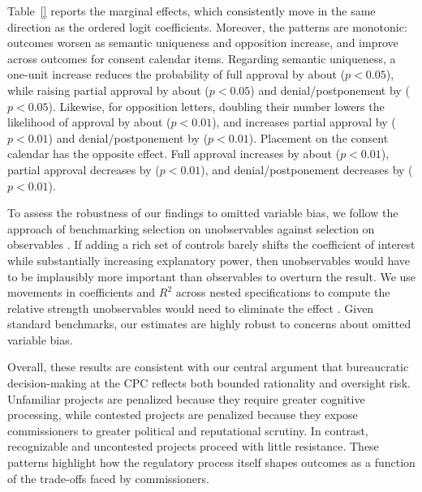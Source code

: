 Table~\ref{} reports the marginal effects, which consistently move in the same direction as the ordered logit coefficients. Moreover, the patterns are monotonic: outcomes worsen as semantic uniqueness and opposition increase, and improve across outcomes for consent calendar items. Regarding semantic uniqueness, a one-unit increase reduces the probability of full approval by about  ($p<0.05$), while raising partial approval by about  ($p<0.05$) and denial/postponement by  ($p<0.05$). Likewise, for opposition letters, doubling their number lowers the likelihood of approval by about  ($p<0.01$), and increases partial approval by  ($p<0.01$) and denial/postponement by  ($p<0.01$). Placement on the consent calendar has the opposite effect. Full approval increases by about  ($p<0.01$), partial approval decreases by  ($p<0.01$), and denial/postponement decreases by  ($p<0.01$).

To assess the robustness of our findings to omitted variable bias, we follow the approach of benchmarking selection on unobservables against selection on observables \citep{AltonjiElderTaber2005}. If adding a rich set of controls barely shifts the coefficient of interest while substantially increasing explanatory power, then unobservables would have to be implausibly more important than observables to overturn the result. We use movements in coefficients and $R^2$ across nested specifications to compute the relative strength unobservables would need to eliminate the effect \citep{Oster2019}. Given standard benchmarks, our estimates are highly robust to concerns about omitted variable bias.

Overall, these results are consistent with our central argument that bureaucratic decision-making at the CPC reflects both bounded rationality and oversight risk. Unfamiliar projects are penalized because they require greater cognitive processing, while contested projects are penalized because they expose commissioners to greater political and reputational scrutiny. In contrast, recognizable and uncontested projects proceed with little resistance. These patterns highlight how the regulatory process itself shapes outcomes as a function of the trade-offs faced by commissioners.
